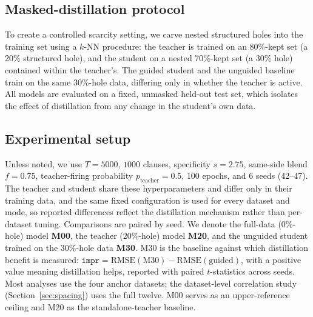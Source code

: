 \subsection{Masked-distillation protocol}
\label{sec:protocol}

To create a controlled scarcity setting, we carve nested structured holes into the training
set using a $k$-NN procedure: the teacher is trained on an 80\%-kept set (a 20\% structured
hole), and the student on a nested 70\%-kept set (a 30\% hole) contained within the
teacher's. The guided student and the unguided baseline train on the same 30\%-hole data,
differing only in whether the teacher is active. All models are evaluated on a fixed,
unmasked held-out test set, which isolates the effect of distillation from any change in the
student's own data.

\subsection{Experimental setup}
\label{sec:setup}

Unless noted, we use $T=5000$, $1000$ clauses, specificity $s=2.75$, same-side blend
$f=0.75$, teacher-firing probability $p_{\text{teacher}}=0.5$, $100$ epochs, and $6$ seeds
(42--47). The teacher and student share these hyperparameters and differ only in their
training data, and the same fixed configuration is used for every dataset and mode, so
reported differences reflect the distillation mechanism rather than per-dataset tuning.
Comparisons are paired by seed. We denote the full-data ($0\%$-hole) model \textbf{M00}, the
teacher ($20\%$-hole) model \textbf{M20}, and the unguided student trained on the
$30\%$-hole data \textbf{M30}. M30 is the baseline against which distillation benefit is
measured: $\texttt{impr} = \mathrm{RMSE}(\text{M30}) - \mathrm{RMSE}(\text{guided})$, with a
positive value meaning distillation helps, reported with paired $t$-statistics across seeds.
Most analyses use the four anchor datasets; the dataset-level correlation study
(Section~\ref{sec:spacing}) uses the full twelve. M00 serves as an upper-reference ceiling
and M20 as the standalone-teacher baseline.
